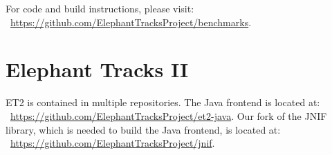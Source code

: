 For code and build instructions, please visit: ~\url{https://github.com/ElephantTracksProject/benchmarks}.

\section{Elephant Tracks II}
ET2 is contained in multiple repositories. The Java frontend is located at: ~\url{https://github.com/ElephantTracksProject/et2-java}.
Our fork of the JNIF library, which is needed to build the Java frontend, is located at: ~\url{https://github.com/ElephantTracksProject/jnif}.
